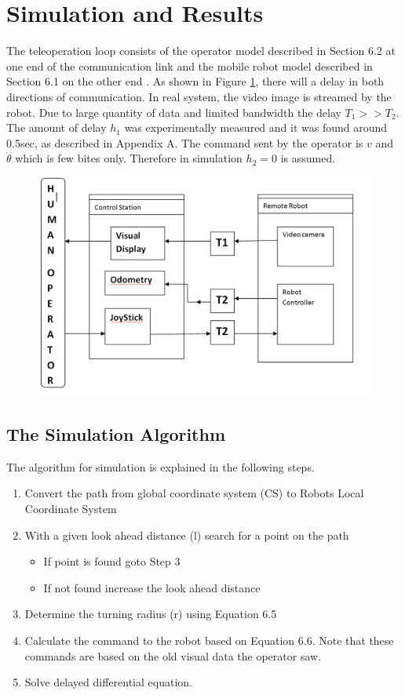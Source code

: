 \section{Simulation and Results }

The teleoperation loop consists of the operator model described in Section 6.2 at one end of the communication link and the mobile robot model described in Section 6.1 on the other end . As shown in Figure \ref{fig:teleloop}, there will a delay in both directions of communication. In real system, the video image is streamed  by the robot. Due to large quantity of data and limited bandwidth the delay $T_1>>T_2$. The amount of delay $h_1$ was experimentally measured  and it was found around 0.5sec, as described in Appendix A. The command sent by the operator is  $v$ and $\dot{\theta}$ which is few bites only.  Therefore in simulation  $h_2=0$ is assumed.


\begin{figure}
	\includegraphics[width=\linewidth,keepaspectratio]{Chapter6/fig/BlockTimeDelay}
	\label{fig:teleloop} 
\end{figure}


\subsection{The Simulation Algorithm} 
The algorithm for simulation is explained in the following steps.
\begin{enumerate}
\item Convert the path from global coordinate system (CS) to Robots Local Coordinate System
\item With a given look ahead distance (l) search for a point on the path
\begin{itemize}
\item If point is found goto Step 3
\item If not found increase the look ahead distance 
\end{itemize}
\item Determine the turning radius (r) using Equation 6.5
\item Calculate the command to the robot based on Equation 6.6. Note that these commands are based on the old visual data the operator saw.
\item Solve delayed  differential equation.
\end{enumerate}

